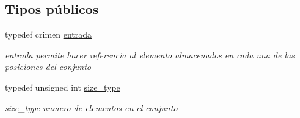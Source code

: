 \subsection*{Tipos públicos}
\begin{DoxyCompactItemize}
\item 
\hypertarget{classconjunto_a09cad766dd65de73e51eae21f9d22585}{}typedef crimen \hyperlink{classconjunto_a09cad766dd65de73e51eae21f9d22585}{entrada}\label{classconjunto_a09cad766dd65de73e51eae21f9d22585}

\begin{DoxyCompactList}\small\item\em entrada permite hacer referencia al elemento almacenados en cada una de las posiciones del conjunto \end{DoxyCompactList}\item 
\hypertarget{classconjunto_a855a5893bb0f5a851ab2dbf2b8aa6cc7}{}typedef unsigned int \hyperlink{classconjunto_a855a5893bb0f5a851ab2dbf2b8aa6cc7}{size\+\_\+type}\label{classconjunto_a855a5893bb0f5a851ab2dbf2b8aa6cc7}

\begin{DoxyCompactList}\small\item\em size\+\_\+type numero de elementos en el conjunto \end{DoxyCompactList}\end{DoxyCompactItemize}
